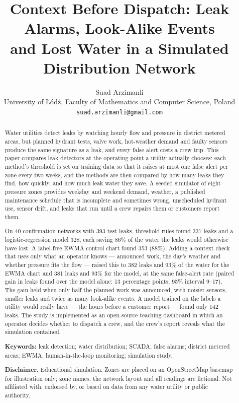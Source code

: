 \documentclass[11pt,a4paper]{article}
\title{Context Before Dispatch: Leak Alarms, Look-Alike Events\\ and Lost Water in a Simulated Distribution Network}
\author{Suad Arzimanli\\[2pt]
        \small University of \L{}ód\'{z}, Faculty of Mathematics and Computer Science, Poland\\
        \small \texttt{suad.arzimanli@gmail.com}}
\date{}
\begin{document}
\maketitle

\begin{abstract}
Water utilities detect leaks by watching hourly flow and pressure in district metered areas, but planned hydrant tests, valve work, hot-weather demand and faulty sensors produce the same signature as a leak, and every false alert costs a crew trip. This paper compares leak detectors at the operating point a utility actually chooses: each method's threshold is set on training data so that it raises at most one false alert per zone every two weeks, and the methods are then compared by how many leaks they find, how quickly, and how much leak water they save. A seeded simulator of eight pressure zones provides weekday and weekend demand, weather, a published maintenance schedule that is incomplete and sometimes wrong, unscheduled hydrant use, sensor drift, and leaks that run until a crew repairs them or customers report them.

On 40 confirmation networks with 393 test leaks, threshold rules found 337 leaks and a logistic-regression model 328, each saving 86\% of the water the leaks would otherwise have lost. A label-free EWMA control chart found 353 (88\%). Adding a context check that uses only what an operator knows --- announced work, the day's weather and whether pressure fits the flow --- raised this to 382 leaks and 93\% of the water for the EWMA chart and 381 leaks and 93\% for the model, at the same false-alert rate (paired gain in leaks found over the model alone: 13 percentage points, 95\% interval 9--17). The gain held when only half the planned work was announced, with noisier sensors, smaller leaks and twice as many look-alike events. A model trained on the labels a utility would really have --- the hours before a customer report --- found only 142 leaks. The study is implemented as an open-source teaching dashboard in which an operator decides whether to dispatch a crew, and the crew's report reveals what the simulation contained.

\medskip
\noindent\textbf{Keywords:} leak detection; water distribution; SCADA; false alarms; district metered areas; EWMA; human-in-the-loop monitoring; simulation study.

\smallskip
\noindent\textbf{Disclaimer.} Educational simulation. Zones are placed on an OpenStreetMap basemap for illustration only; zone names, the network layout and all readings are fictional. Not affiliated with, endorsed by, or based on data from any water utility or public authority.
\end{abstract}
\end{document}
